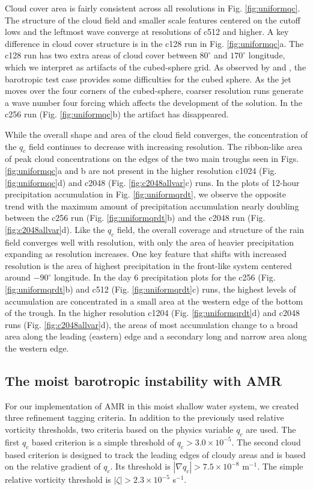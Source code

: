 Cloud cover area is fairly consistent across all resolutions in Fig. \ref{fig:uniformqc}.
The structure of the cloud field and smaller scale features centered on the cutoff 
lows and the leftmost wave converge at resolutions of c512 and higher. A key
difference in cloud cover structure is in the c128 run in Fig. \ref{fig:uniformqc}a.
The c128 run has two extra areas of cloud cover between $80^\circ$ and
$170^\circ$ longitude, which we interpret as artifacts of the cubed-sphere grid.
As observed by \cite{st2007comparison} and \cite{ullrich:2010vn}, the barotropic
test case provides some difficulties for the cubed sphere. As the jet moves over the four corners of the cubed-sphere, coarser resolution runs generate a wave number
four forcing which affects the development of the solution. In the c256 run (Fig. \ref{fig:uniformqc}b) 
the artifact has disappeared.

While the overall shape and area of the cloud field converges, the concentration
of the $q_c$ field continues to decrease with increasing resolution.
The ribbon-like area of peak cloud concentrations on the edges of the two main troughs
seen in Figs. \ref{fig:uniformqc}a and b are not present in the higher resolution c1024
(Fig. \ref{fig:uniformqc}d) and c2048 (Fig. \ref{fig:c2048allvar}c) runs. In the
plots of 12-hour precipitation accumulation in Fig. \ref{fig:uniformqrdt}, we
observe the opposite trend with the maximum amount of precipitation accumulation 
nearly doubling between the c256 run (Fig. \ref{fig:uniformqrdt}b) and the
c2048 run (Fig. \ref{fig:c2048allvar}d). Like the $q_c$ field, the overall coverage and 
structure of the rain field converges well with resolution, with only the area of 
heavier precipitation expanding as resolution increases. One key feature that
shifts with increased resolution is the area of highest precipitation 
in the front-like system centered around $-90^\circ$ longitude. In the day 6 
precipitation plots for the c256 (Fig. \ref{fig:uniformqrdt}b) and c512 
(Fig. \ref{fig:uniformqrdt}c) runs, the highest levels of accumulation
are concentrated in a small area at the western edge of the bottom
of the trough. In the higher resolution c1204 (Fig. \ref{fig:uniformqrdt}d)
and c2048 runs (Fig. \ref{fig:c2048allvar}d), the areas of most accumulation 
change to a broad area along the leading (eastern) edge and
a secondary long and narrow area along the western edge.

\subsection{The moist barotropic instability with AMR}
  For our implementation of AMR in this moist shallow water
system, we created three refinement tagging criteria. In addition to
the previously used relative vorticity thresholds, two criteria based
on the physics variable $q_c$ are used. The first $q_c$ based criterion is a 
simple threshold of $q_c > 3.0 \times 10^{-5}$. The second cloud based 
criterion is designed to track the leading edges of cloudy areas and is based on the relative gradient of $q_c$. 
Its threshold is $|\nabla q_c| > 7.5\times 10^{-8}$ m$^{-1}$.
The simple relative vorticity threshold is $|\zeta| > 2.3 \times 10^{-5}$ s$^{-1}$.

